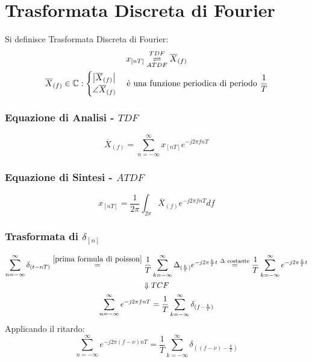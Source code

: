 \section{Trasformata Discreta di Fourier}
    Si definisce Trasformata Discreta di Fourier:
    \begin{gather}
        x_{[nT]} \overunderset{TDF}{ATDF}{\rightleftharpoons} \overline{X}_{(f)} \nonumber \\
        \overline{X}_{(f)} \in \mathbb{C}: \begin{cases}
            \left| \overline{X}_{(f)} \right| \nonumber \\
            \angle \overline{X}_{(f)} \nonumber
        \end{cases} \text{é una funzione periodica di periodo }\frac{1}{T}\nonumber  
    \end{gather}
    \subsubsection{Equazione di Analisi - $TDF$} \label{TDF}
        \[
            \overline{X}_{(f)} = \sum_{n=-\infty}^{\infty} x_{[nT]}e^{-j2\pi fnT}
        \]
    \subsubsection{Equazione di Sintesi - $ATDF$} \label{ATDF}
        \[
            x_{[nT]} = \frac{1}{2\pi} \int_{2\pi} \overline{X}_{(f)}e^{-j2\pi fnT} df
        \]
    \subsubsection{Trasformata di $\delta_{[n]}$}\label{tdf sequenza di delta}
        \begin{gather}
            \sum_{n=-\infty}^{\infty}\delta_{(t-nT)} \overset{\ref{prima formula di poisson}}{=} \frac{1}{T} \sum_{k=-\infty}^{\infty} \Delta_{(\frac{k}{T})}e^{-j2\pi \frac{k}{T}t} \overset{\Delta \text{ costante}}{=} \frac{1}{T} \sum_{k=-\infty}^{\infty} e^{-j2\pi \frac{k}{T}t} \nonumber \\
            \Downarrow TCF\nonumber \\
            \sum_{n=-\infty}^{\infty}e^{-j2\pi fnT} = \frac{1}{T} \sum_{k=-\infty}^{\infty} \delta_{(f-\frac{k}{T})}\nonumber
        \end{gather}
        Applicando il ritardo:
        \[
            \sum_{n=-\infty}^{\infty}e^{-j2\pi (f-\nu)nT} = \frac{1}{T} \sum_{k=-\infty}^{\infty} \delta_{((f-\nu)-\frac{k}{T})}
        \]
